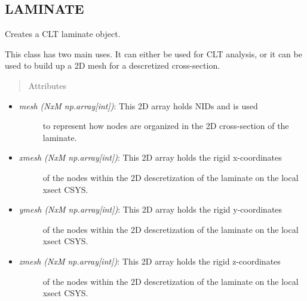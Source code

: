 \documentclass[letterpaper,10pt,english]{sphinxmanual}
\begin{document}
\subsection{LAMINATE}
\label{structures:laminate}

\begin{fulllineitems}
\label{structures:AeroComBAT.Structures.Laminate}
Creates a CLT laminate object.

This class has two main uses. It can either be used for CLT analysis, or it
can be used to build up a 2D mesh for a descretized cross-section.
\begin{quote}\begin{description}
\item[{Attributes}] \leavevmode
\end{description}\end{quote}
\begin{itemize}
\item {} \begin{description}
\item[{\emph{mesh (NxM np.array{[}int{]})}: This 2D array holds NIDs and is used}] \leavevmode
to represent how nodes are organized in the 2D cross-section of
the laminate.

\end{description}

\item {} \begin{description}
\item[{\emph{xmesh (NxM np.array{[}int{]})}: This 2D array holds the rigid x-coordinates}] \leavevmode
of the nodes within the 2D descretization of the laminate on the
local xsect CSYS.

\end{description}

\item {} \begin{description}
\item[{\emph{ymesh (NxM np.array{[}int{]})}: This 2D array holds the rigid y-coordinates}] \leavevmode
of the nodes within the 2D descretization of the laminate on the
local xsect CSYS.

\end{description}

\item {} \begin{description}
\item[{\emph{zmesh (NxM np.array{[}int{]})}: This 2D array holds the rigid z-coordinates}] \leavevmode
of the nodes within the 2D descretization of the laminate on the
local xsect CSYS.


\end{description}
\end{itemize}
\end{fulllineitems}
\end{document}
